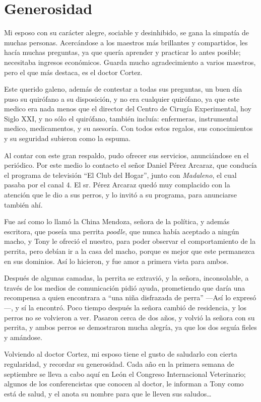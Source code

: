 \documentclass[letterpaper, 12pt]{book}
\begin{document}
\chapter{Generosidad}
Mi esposo con su carácter alegre, sociable y desinhibido, se gana la simpatía de muchas personas. Acercándose a los maestros más brillantes y compartidos, les hacía muchas preguntas, ya que quería aprender y practicar lo antes posible; necesitaba ingresos económicos. Guarda mucho agradecimiento a varios maestros, pero el que más destaca, es el doctor Cortez.

Este querido galeno, además de contestar a todas sus preguntas, un buen día puso su quirófano a su disposición, y no era cualquier quirófano, ya que este medico era nada menos que el director del Centro de Cirugía Experimental, hoy Siglo XXI, y no sólo el quirófano, también incluía: enfermeras, instrumental medico, medicamentos, y su asesoría. Con todos estos regalos, sus conocimientos y su seguridad subieron como la espuma.

Al contar con este gran respaldo, pudo ofrecer sus servicios, anunciándose en el periódico. Por este medio lo contacto el señor Daniel Pérez Arcaraz, que conducía el programa de televisión ``El Club del Hogar'', junto con \textit{Madaleno}, el cual pasaba por el canal 4. El sr. Pérez Arcaraz quedó muy complacido con la atención que le dio a sus perros, y lo invitó a su programa, para anunciarse también ahí. 

Fue así como lo llamó la China Mendoza, señora de la política, y además escritora, que poseía una perrita \textit{poodle}, que nunca había aceptado a ningún macho, y Tony le ofreció el nuestro, para poder observar el comportamiento de la perrita, pero debían ir a la casa del macho, porque es mejor que este permanezca en sus dominios. Así lo hicieron, y fue amor a primera vista para ambos.

Después de algunas camadas, la perrita se extravió, y la señora, inconsolable, a través de los medios de comunicación pidió ayuda, prometiendo que daría una recompensa a quien encontrara a ``una niña disfrazada de perra'' ---Así lo expresó---, y sí la encontró. Poco tiempo después la señora cambió de residencia, y los perros no se volvieron a ver. Pasaron cerca de dos años, y volvió la señora con su perrita, y ambos perros se demostraron mucha alegría, ya que los dos seguía fieles y amándose.

Volviendo al doctor Cortez, mi esposo tiene el gusto de saludarlo con cierta regularidad, y recordar su generosidad. Cada año en la primera semana de septiembre se lleva a cabo aquí en León el Congreso Internacional Veterinario; algunos de los conferencistas que conocen al doctor, le informan a Tony como está de salud, y el anota su nombre para que le lleven sus saludos\ldots
\end{document}
